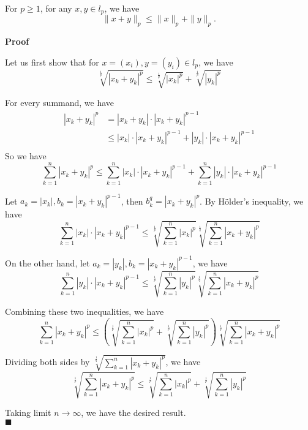 \documentclass[main.tex]{subfiles}
\begin{document}
\begin{theorem}
    For $p \ge 1$, for any $x, y \in l_p$, we have \[ \|x + y\|_p \le \|x\|_p + \|y\|_p. \]
\end{theorem}
\par \noindent \textbf{Proof}  
\par Let us first show that for $x = (x_i), y = (y_i) \in l_p$, we have \[ \sqrt[\frac{1}{p}]{|x_k + y_k|^p} \le \sqrt[\frac{1}{p}]{|x_k|^p} + \sqrt[\frac{1}{p}]{|y_k|^p} \] 
\par For every summand, we have 
\begin{align*}
    |x_k + y_k|^p & = |x_k + y_k| \cdot |x_k + y_k|^{p-1} \\
    & \le |x_k| \cdot |x_k + y_k|^{p-1} + |y_k| \cdot |x_k + y_k|^{p-1} \\
\end{align*}
So we have 
\begin{equation}
    \sum_{k=1}^{n} |x_k + y_k|^p \le \sum_{k=1}^{n} |x_k| \cdot |x_k + y_k|^{p-1} + \sum_{k=1}^{n} |y_k| \cdot |x_k + y_k|^{p-1}
\end{equation}
\par Let $a_k = |x_k|, b_k = |x_k + y_k|^{p-1}$, then $b_k^q = |x_k + y_k|^p$. By Hölder's inequality, we have 
\[
    \sum_{k=1}^{n} |x_k| \cdot |x_k + y_k|^{p-1} \le \sqrt[\frac{1}{p}]{\sum_{k=1}^{n} |x_k|^p} \sqrt[\frac{1}{q}]{\sum_{k=1}^{n} |x_k + y_k|^p}
\]
\par On the other hand, let $a_k = |y_k|, b_k = |x_k + y_k|^{p-1}$, we have
\[
    \sum_{k=1}^{n} |y_k| \cdot |x_k + y_k|^{p-1} \le \sqrt[\frac{1}{p}]{\sum_{k=1}^{n} |y_k|^p} \sqrt[\frac{1}{q}]{\sum_{k=1}^{n} |x_k + y_k|^p}
\]
\par Combining these two inequalities, we have
\begin{equation}
    \sum_{k=1}^{n} |x_k + y_k|^p \le \left( \sqrt[\frac{1}{p}]{\sum_{k=1}^{n} |x_k|^p} + \sqrt[\frac{1}{p}]{\sum_{k=1}^{n} |y_k|^p} \right) \sqrt[\frac{1}{q}]{\sum_{k=1}^{n} |x_k + y_k|^p}
\end{equation}
\par Dividing both sides by $\sqrt[\frac{1}{q}]{\sum_{k=1}^{n} |x_k + y_k|^p}$, we have
\begin{equation}
    \sqrt[\frac{1}{p}]{\sum_{k=1}^{n} |x_k + y_k|^p} \le \sqrt[\frac{1}{p}]{\sum_{k=1}^{n} |x_k|^p} + \sqrt[\frac{1}{p}]{\sum_{k=1}^{n} |y_k|^p}
\end{equation}
\par Taking limit $n \to \infty$, we have the desired result.
\\ \null \hfill $\blacksquare$ 
\end{document}
